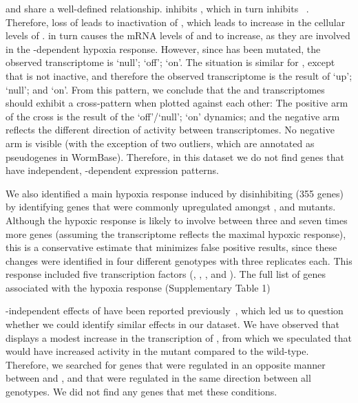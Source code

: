  and  share a well-defined relationship. \rhyp{}
inhibits \cyslp{},
which in turn inhibits \eglp{}~\citep{Ma2012}. Therefore, loss of \rhyp{} leads
to inactivation of \eglp{}, which leads to increase in the cellular levels of
\hifp{}. \hifp{} in turn causes the mRNA levels of  and 
to increase,
as they are involved in the -dependent hypoxia response. However,
since  has been mutated, the observed transcriptome is \rhyp{}
`null'; \eglp{} `off'; \hifp{} `on'. The situation is similar for \egl{}, except
that \rhyp{} is not inactive, and therefore the observed transcriptome is the
result of \rhyp{} `up'; \eglp{} `null'; and \hifp{} `on'. From this pattern, we
conclude that the \egl{} and \rhy{} transcriptomes should exhibit a cross-pattern
when plotted against each other: The positive arm of the cross is the result of
the \eglp{} `off'/`null'; \hifp{} `on' dynamics; and the negative arm reflects the
different direction of \rhyp{} activity between transcriptomes. No negative arm
is visible (with the exception of two outliers, which are annotated as
pseudogenes in WormBase). Therefore, in this dataset we do not find genes that
have  independent, -dependent expression patterns.

We also identified a main hypoxia response induced by disinhibiting
 (355 genes) by identifying genes that were commonly upregulated
amongst \egl{}, \rhy{} and \vhl{} mutants. Although the hypoxic response is likely
to involve between three and seven times more genes (assuming the \rhy{} transcriptome
reflects the maximal hypoxic response), this is a conservative
estimate that minimizes false positive results, since these changes were
identified in four different genotypes with three replicates each. This response
included five transcription factors (, \nhr{}, ,
 and ). The full list of genes associated with the
hypoxia response (Supplementary Table 1)

-independent effects of  have been reported
previously~\citep{Park2012}, which led us to question whether we could identify
similar effects in our dataset. We have observed that \hif{} displays a modest
increase in the transcription of , from which we speculated that
\eglp{} would have increased activity in the \hif{} mutant compared to the wild-type.
Therefore, we searched for genes that were regulated in an opposite manner between
\hif{} and \eglhif{}, and that were regulated in the same direction between
all \egl{} genotypes. We did not find any genes that met these conditions.

